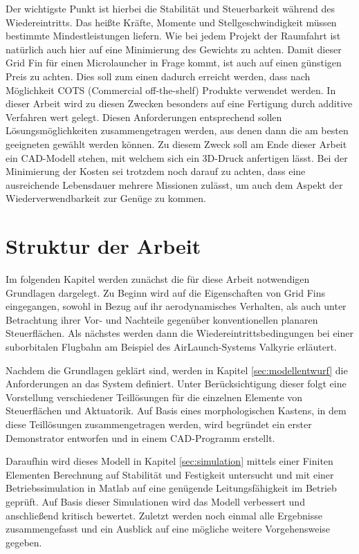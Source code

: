 Der wichtigste Punkt ist hierbei die Stabilität und Steuerbarkeit während des Wiedereintritts. Das heißte Kräfte, Momente und Stellgeschwindigkeit müssen bestimmte Mindestleistungen liefern. Wie bei jedem Projekt der Raumfahrt ist natürlich auch hier auf eine Minimierung des Gewichts zu achten. Damit dieser Grid Fin für einen Microlauncher in Frage kommt, ist auch auf einen günstigen Preis zu achten. Dies soll zum einen dadurch erreicht werden, dass nach Möglichkeit COTS (Commercial off-the-shelf) Produkte verwendet werden. In dieser Arbeit wird zu diesen Zwecken besonders auf eine Fertigung durch additive Verfahren wert gelegt.
Diesen Anforderungen entsprechend sollen Lösungsmöglichkeiten zusammengetragen werden, aus denen dann die am besten geeigneten gewählt werden können. Zu diesem Zweck soll am Ende dieser Arbeit ein CAD-Modell stehen, mit welchem sich ein 3D-Druck anfertigen lässt. Bei der Minimierung der Kosten sei trotzdem noch darauf zu achten, dass eine ausreichende Lebensdauer mehrere Missionen zulässt, um auch dem Aspekt der Wiederverwendbarkeit zur Genüge zu kommen.

\section{Struktur der Arbeit}
Im folgenden Kapitel werden zunächst die für diese Arbeit notwendigen Grundlagen dargelegt. Zu Beginn wird auf die Eigenschaften von Grid Fins eingegangen, sowohl in Bezug auf ihr aerodynamisches Verhalten, als auch unter Betrachtung ihrer Vor- und Nachteile gegenüber konventionellen planaren Steuerflächen. Als nächstes werden dann die Wiedereintrittsbedingungen bei einer suborbitalen Flugbahn am Beispiel des AirLaunch-Systems Valkyrie erläutert.

Nachdem die Grundlagen geklärt sind, werden in Kapitel \ref{sec:modellentwurf} die Anforderungen an das System definiert. Unter Berücksichtigung dieser folgt eine Vorstellung verschiedener Teillösungen für die einzelnen Elemente von Steuerflächen und Aktuatorik. Auf Basis eines morphologischen Kastens, in dem diese Teillösungen zusammengetragen werden, wird begründet ein erster Demonstrator entworfen und in einem CAD-Programm erstellt.

Daraufhin wird dieses Modell in Kapitel \ref{sec:simulation} mittels einer Finiten Elementen Berechnung auf Stabilität und Festigkeit untersucht und mit einer Betriebssimulation in Matlab auf eine genügende
Leitungsfähigkeit im Betrieb geprüft. Auf Basis dieser Simulationen wird das Modell verbessert und anschließend kritisch bewertet.
Zuletzt werden noch einmal alle Ergebnisse zusammengefasst und ein Ausblick auf eine mögliche weitere Vorgehensweise gegeben.